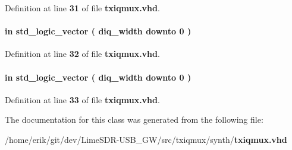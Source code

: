 Definition at line {\bf 31} of file {\bf txiqmux.\+vhd}.

\paragraph[{wfm\+\_\+diq\+\_\+h}]{ {\bfseries \textcolor{keywordflow}{in}\textcolor{vhdlchar}{ }} {\bfseries \textcolor{comment}{std\+\_\+logic\+\_\+vector}\textcolor{vhdlchar}{ }\textcolor{vhdlchar}{(}\textcolor{vhdlchar}{ }\textcolor{vhdlchar}{ }\textcolor{vhdlchar}{ }\textcolor{vhdlchar}{ }{\bfseries {\bf diq\+\_\+width}} \textcolor{vhdlchar}{ }\textcolor{keywordflow}{downto}\textcolor{vhdlchar}{ }\textcolor{vhdlchar}{ } \textcolor{vhdldigit}{0} \textcolor{vhdlchar}{ }\textcolor{vhdlchar}{)}\textcolor{vhdlchar}{ }} \hspace{0.3cm}{\ttfamily [Port]}}\label{classtxiqmux_adf65a68a6a34fb1ebd271256b065eaa6}


Definition at line {\bf 32} of file {\bf txiqmux.\+vhd}.

\paragraph[{wfm\+\_\+diq\+\_\+l}]{ {\bfseries \textcolor{keywordflow}{in}\textcolor{vhdlchar}{ }} {\bfseries \textcolor{comment}{std\+\_\+logic\+\_\+vector}\textcolor{vhdlchar}{ }\textcolor{vhdlchar}{(}\textcolor{vhdlchar}{ }\textcolor{vhdlchar}{ }\textcolor{vhdlchar}{ }\textcolor{vhdlchar}{ }{\bfseries {\bf diq\+\_\+width}} \textcolor{vhdlchar}{ }\textcolor{keywordflow}{downto}\textcolor{vhdlchar}{ }\textcolor{vhdlchar}{ } \textcolor{vhdldigit}{0} \textcolor{vhdlchar}{ }\textcolor{vhdlchar}{)}\textcolor{vhdlchar}{ }} \hspace{0.3cm}{\ttfamily [Port]}}\label{classtxiqmux_a152904dcf222aec576522cdda80aa48a}


Definition at line {\bf 33} of file {\bf txiqmux.\+vhd}.



The documentation for this class was generated from the following file\+:\begin{DoxyCompactItemize}
\item 
/home/erik/git/dev/\+Lime\+S\+D\+R-\/\+U\+S\+B\+\_\+\+G\+W/src/txiqmux/synth/{\bf txiqmux.\+vhd}\end{DoxyCompactItemize}
